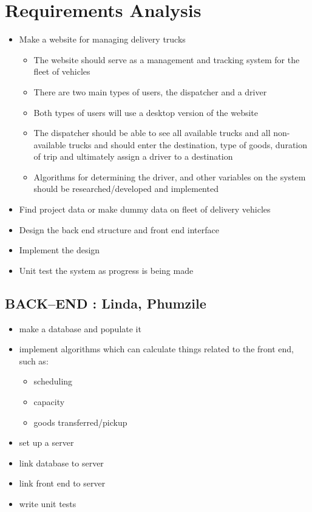 \documentclass[paper=a4, fontsize=11pt]{scrartcl} %
\numberwithin{equation}{section} %
\numberwithin{figure}{section} %
\numberwithin{table}{section} %
\begin{document}

\section{	Requirements Analysis}

\begin{itemize}
	\item Make a website for managing delivery trucks
		\begin{itemize}
		 
		
			\item The website should serve as a management and tracking system for the fleet of vehicles
			\item There are two main types of users, the dispatcher and a driver
			\item Both types of users will use a desktop version of the website
			\item  The dispatcher should be able to see all available trucks and all non-available trucks and should enter the destination, type of goods, duration of trip and ultimately assign a driver to a destination
			\item Algorithms for determining the driver, and other variables on the system should be researched/developed and implemented
		
		 
		\end{itemize}
		\item	Find project data or make dummy data on fleet of delivery vehicles
	\item	Design the back end structure and front end interface
		\item	Implement the design 
		\item	Unit test the system as progress is being made
	 
\end{itemize}






\subsection{	BACK--END : Linda, Phumzile}


\begin{itemize}
	\item  make a database and populate it
	\item  implement algorithms which can calculate things related to the front end, such as:
		\begin{itemize}
		 \item scheduling
		\item capacity
		\item goods transferred/pickup 
		\end{itemize}
	\item set up a server
	\item link database to server
	\item	link front end to server
	\item	write unit tests  
\end{itemize}
\end{document}
